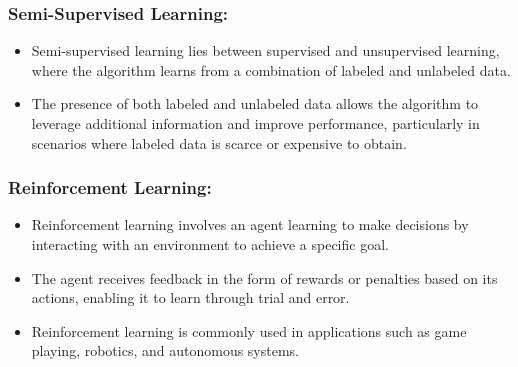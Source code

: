 \subsubsection*{Semi-Supervised Learning:}

\begin{itemize}
    \item{Semi-supervised learning lies between supervised and unsupervised learning, where the algorithm learns from a combination of labeled and unlabeled data.}
    \item{The presence of both labeled and unlabeled data allows the algorithm to leverage additional information and improve performance, particularly in scenarios where labeled data is scarce or expensive to obtain.}
\end{itemize}

\subsubsection*{Reinforcement Learning:}

\begin{itemize}
    \item{Reinforcement learning involves an agent learning to make decisions by interacting with an environment to achieve a specific goal.}
    \item{The agent receives feedback in the form of rewards or penalties based on its actions, enabling it to learn through trial and error.}
    \item{Reinforcement learning is commonly used in applications such as game playing, robotics, and autonomous systems.}
\end{itemize}

